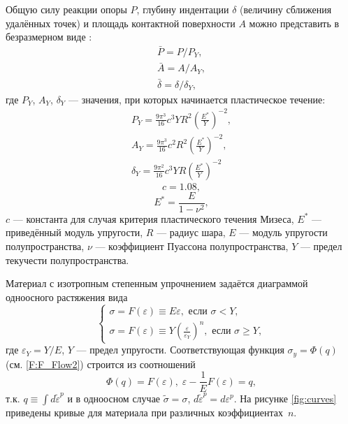 \documentclass[]{article}
\begin{document}
Общую силу реакции опоры $P$, глубину индентации $\delta$ (величину сближения удалённых точек) и площадь контактной поверхности $A$ можно представить в безразмерном виде \cite{Song2014}:
\begin{equation}
\begin{gathered}
\bar{P}=P/P_Y,\\
\bar{A}=A/A_Y,\\
\bar{\delta}=\delta/\delta_Y,
\label{F:test1_dimensionless_form1}
\end{gathered}
\end{equation}
где $P_Y$, $A_Y$, $\delta_Y$ --- значения, при которых начинается пластическое течение:
\begin{equation}
\begin{gathered}
P_Y=\frac{9\pi^3}{16} c^3 Y R^2\left(\frac{E^*}{Y}\right)^{-2},\\
A_Y=\frac{9\pi^3}{16} c^2 R^2\left(\frac{E^*}{Y}\right)^{-2},\\
\delta_Y=\frac{9\pi^2}{16} c^3 Y R\left(\frac{E^*}{Y}\right)^{-2}
\label{F:test1_dimensionless_form2}
\end{gathered}
\end{equation}
\begin{equation}
c=1.08,
\label{F:test1_dimensionless_form3}
\end{equation}
\begin{equation}
E^*=\frac{E}{1-\nu^2},
\label{F:test1_dimensionless_form4}
\end{equation}
$c$ --- константа для случая критерия пластического течения Мизеса, $E^*$ --- приведённый модуль упругости, $R$ --- радиус шара, $E$ --- модуль упругости полупространства, $\nu$ --- коэффициент Пуассона полупространства, $Y$ --- предел текучести полупространства.

Материал с изотропным степенным упрочнением задаётся диаграммой одноосного растяжения вида
\begin{equation}
\begin{cases}
\sigma=F\left(\varepsilon\right)\equiv E\varepsilon,\mbox{ если }\sigma<Y,\\
\sigma=F\left(\varepsilon\right)\equiv Y\left(\frac{\varepsilon}{\varepsilon_Y}\right)^n,\mbox{ если }\sigma\geqslant Y,
\end{cases}
\label{F:test1_isotropic_strain_hardening1}
\end{equation}
где $\varepsilon_Y=Y/E$, $Y$ --- предел упругости. Соответствующая функция $\sigma_y=\Phi\left(q\right)$ (см. \eqref{F:F_Flow2}) строится из соотношений
\begin{equation}
\Phi\left(q\right)=F\left(\varepsilon\right),\; \varepsilon-\frac{1}{E} F\left(\varepsilon\right)=q,
\label{F:test1_isotropic_strain_hardening2}
\end{equation}
т.к. $q\equiv\int d\tilde{\varepsilon}^{p}$ и в одноосном случае $\tilde{\sigma}=\sigma$, $d\tilde{\varepsilon}^{p}=d\varepsilon^{p}$. На рисунке \ref{fig:curves} приведены кривые для материала при различных \mbox{коэффициентах $n$}.
\end{document}
